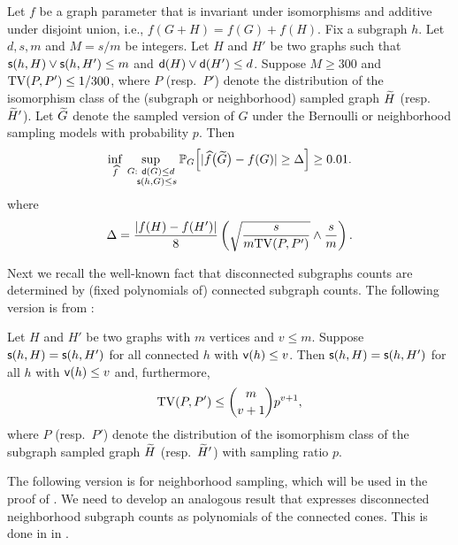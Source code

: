 \begin{theorem} \label{thm:mainlb}
Let $ f $ be a graph parameter that is invariant under isomorphisms and additive under disjoint union, i.e., $f(G+H)=f(G)+f(H)$. Fix a subgraph $ h $.
Let $d,s, m $ and $ M = s/m $ be integers. Let $ H $ and $ H' $ be two graphs such that $ \mathsf{s}(h, H) \vee \mathsf{s}(h, H') \leq m $ and ${\mathsf{d}}(H)\vee {\mathsf{d}}(H') \leq d$.
Suppose $ M \geq 300 $ and $ {\rm TV}(P,P') \leq 1/300 $,
where $P$ (resp.~$P'$) denote the distribution of the isomorphism class of the (subgraph or neighborhood) sampled graph ${\widetilde{H}}$ (resp.~${\widetilde{H}}'$).
Let ${\widetilde{G}}$ denote the sampled version of $G$ under the Bernoulli or neighborhood sampling models with probability $p$.
Then
\begin{equation}
\inf_{\widehat{f}} \sup_{\substack{G: ~{\mathsf{d}}(G)\leq d\\ ~~~\mathsf{s}(h,G) \leq s}} \mathbb{P}_G\Big[|\widehat{f}\big({\widetilde{G}}\big)-f(G)| \geq \Delta \Big] \geq 0.01.
\label{eq:mainlb}
\end{equation}
where
\begin{equation*}
\Delta = \frac{|f(H)-f(H')|}{8}\left({\sqrt{\frac{s}{m{\rm TV}(P,P')}}}  \wedge \frac{s}{m}\right).
\end{equation*}
\end{theorem}

Next we recall the well-known fact \cite{Whitney1932,Kocay1982} that disconnected subgraphs counts are determined by (fixed polynomials of) connected subgraph counts. The following version is 
from \cite[Corollary 1 and Lemma 9]{KlusowskiWu2017-cc}:
\begin{lemma} \label{lmm:counts}
Let $ H $ and $ H' $ be two graphs with $m$ vertices and $v \leq m$. 
Suppose $ \mathsf{s}(h, H) = \mathsf{s}(h, H') $ for all connected $ h $ with $ {\mathsf{v}}(h) \leq v $. Then $ \mathsf{s}(h, H) = \mathsf{s}(h, H') $ for all $ h $ with $ {\mathsf{v}}(h) \leq v $ and, furthermore,
\[
{\rm TV}(P,P') \leq \binom{m}{v+1} p^{v+1},
 \]
where $P$ (resp.~$P'$) denote the distribution of the isomorphism class of the subgraph sampled graph ${\widetilde{H}}$ (resp.~${\widetilde{H}}'$) with sampling ratio $p$.
\end{lemma}


The following version is for neighborhood sampling, which will be used in the proof of . We need to develop an analogous result that expresses disconnected neighborhood subgraph counts as polynomials of the connected cones. This is done in  in .


